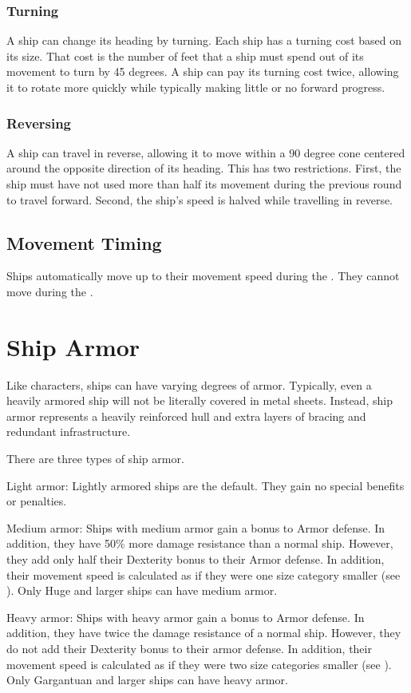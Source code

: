     \subsubsection{Turning}
      A ship can change its heading by turning.
      Each ship has a turning cost based on its size.
      That cost is the number of feet that a ship must spend out of its movement to turn by 45 degrees.
      A ship can pay its turning cost twice, allowing it to rotate more quickly while typically making little or no forward progress.

    \subsubsection{Reversing}
      A ship can travel in reverse, allowing it to move within a 90 degree cone centered around the opposite direction of its heading.
      This has two restrictions.
      First, the ship must have not used more than half its movement during the previous round to travel forward.
      Second, the ship's speed is halved while travelling in reverse.

  \subsection{Movement Timing}
    Ships automatically move up to their movement speed during the .
    They cannot move during the .

\section{Ship Armor}\label{Ship Armor}
  Like characters, ships can have varying degrees of armor.
  Typically, even a heavily armored ship will not be literally covered in metal sheets.
  Instead, ship armor represents a heavily reinforced hull and extra layers of bracing and redundant infrastructure.

  There are three types of ship armor.
  \begin{raggeditemize}
    \item Light armor: Lightly armored ships are the default. They gain no special benefits or penalties.
    \item Medium armor: Ships with medium armor gain a  bonus to Armor defense.
      In addition, they have 50\% more damage resistance than a normal ship.
      However, they add only half their Dexterity bonus to their Armor defense.
      In addition, their movement speed is calculated as if they were one size category smaller (see ).
      Only Huge and larger ships can have medium armor.
    \item Heavy armor: Ships with heavy armor gain a  bonus to Armor defense.
      In addition, they have twice the damage resistance of a normal ship.
      However, they do not add their Dexterity bonus to their armor defense.
      In addition, their movement speed is calculated as if they were two size categories smaller (see ).
      Only Gargantuan and larger ships can have heavy armor.
  \end{raggeditemize}

